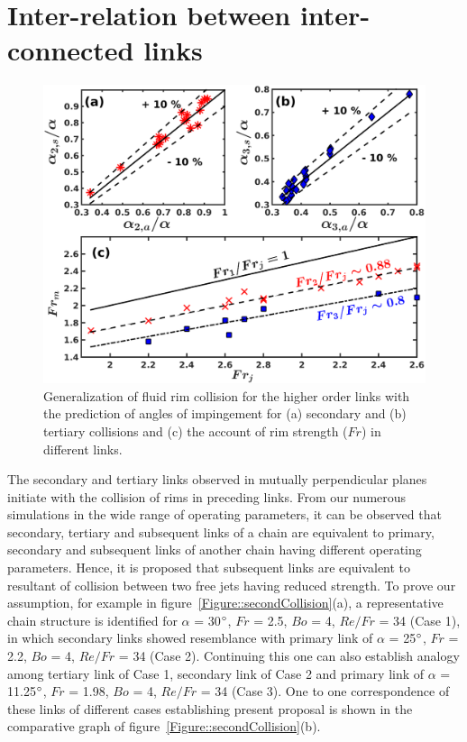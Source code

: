 \section{Inter-relation between inter-connected links}
\begin{figure}
	\centering
	\includegraphics[width=\linewidth]{chapters/Figure12}
	\caption{Generalization of fluid rim collision for the higher order links with the prediction of angles of impingement for (a) secondary and (b) tertiary collisions and (c) the account of rim strength ($Fr$) in different links.}
	\label{Figure::secondGraph}
\end{figure}
The secondary and tertiary links observed in mutually perpendicular planes initiate with the collision of rims in preceding links. From our numerous simulations in the wide range of operating parameters, it can be observed that secondary, tertiary and subsequent links of a chain are equivalent to primary, secondary and subsequent links of another chain having different operating parameters. Hence, it is proposed that subsequent links are equivalent to resultant of collision between two free jets having reduced strength. To prove our  assumption, for example in figure~\ref{Figure::secondCollision}(a), a representative chain structure is identified for $\alpha$ = 30$\degree$, $Fr$ = 2.5, $Bo$ = 4, $Re/Fr$ = 34 (Case 1), in which secondary links showed resemblance with primary link of $\alpha$ = 25$\degree$, $Fr$ = 2.2, $Bo$ = 4, $Re/Fr$ = 34 (Case 2). Continuing this one can also establish analogy among tertiary link of Case 1, secondary link of Case 2 and primary link of $\alpha$ = 11.25$\degree$, $Fr$ = 1.98, $Bo$ = 4, $Re/Fr$ = 34 (Case 3). One to one correspondence of these links of different cases establishing present proposal is shown in the comparative graph of figure~\ref{Figure::secondCollision}(b). \\
